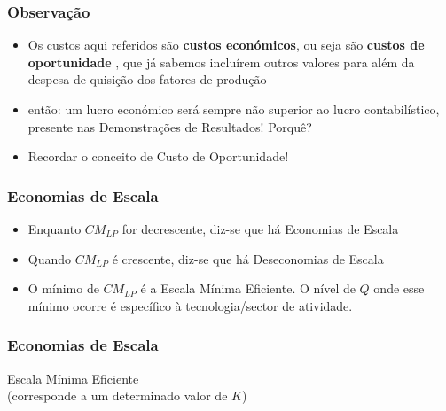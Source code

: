 \begin{frame}
	\frametitle{Observa\c c\~ao}
	\begin{itemize}
		\item Os custos aqui referidos s\~ao \textbf{custos econ\'omicos}, ou seja s\~ao \textbf{custos de oportunidade} , que j\'a sabemos inclu\'irem outros valores para al\'em da despesa de quisi\c c\~ao dos fatores de produ\c c\~ao
		\item ent\~ao: um lucro econ\'omico ser\'a sempre n\~ao superior ao lucro contabil\'istico, presente nas Demonstra\c c\~oes de Resultados! Porqu\^e?
		\item Recordar o conceito de Custo de Oportunidade!
	\end{itemize}
\end{frame}

\begin{frame}
	\frametitle{Economias de Escala}
	\begin{itemize}
		\item Enquanto $CM_{LP}$ for decrescente, diz-se que h\'a Economias de Escala
		\item Quando $CM_{LP}$ \'e crescente, diz-se que h\'a Deseconomias de Escala
		\item O m\'inimo de $CM_{LP}$ \'e a Escala M\'inima Eficiente. O n\'ivel de $Q$ onde esse m\'inimo ocorre \'e espec\'ifico \`a tecnologia/sector de atividade.
	\end{itemize}
\end{frame}

\begin{frame}
	\frametitle{Economias de Escala}
	\begin{center}

		Escala M\'inima Eficiente \\ (corresponde a um determinado valor de $K$)
	\end{center}
\end{frame}

